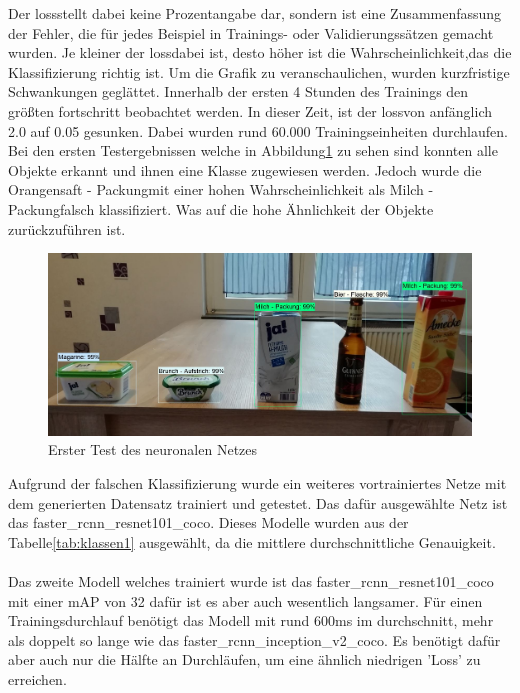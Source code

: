 \documentclass[a4paper,12pt,oneside]{article}
\begin{document}
Der \glqq loss\grqq stellt dabei keine Prozentangabe dar, sondern ist eine Zusammenfassung der Fehler, die für jedes Beispiel in Trainings- oder Validierungssätzen gemacht wurden. Je kleiner der \glqq loss\grqq dabei ist, desto höher ist die Wahrscheinlichkeit,das die Klassifizierung richtig ist. Um die Grafik zu veranschaulichen, wurden kurzfristige Schwankungen geglättet. Innerhalb der ersten 4 Stunden des Trainings den größten fortschritt beobachtet werden. In dieser Zeit, ist der \glqq loss\grqq von anfänglich 2.0 auf 0.05 gesunken. Dabei wurden rund 60.000 Trainingseinheiten durchlaufen.\\
Bei den ersten Testergebnissen welche in Abbildung\ref{img:TestNN} zu sehen sind konnten alle Objekte erkannt und ihnen eine Klasse zugewiesen werden. Jedoch wurde die \glqq Orangensaft - Packung\grqq mit einer hohen Wahrscheinlichkeit als \glqq Milch - Packung\grqq falsch klassifiziert. Was auf die hohe Ähnlichkeit der Objekte zurückzuführen ist.
\\

\begin{figure}
    [h]
	\centering
	\includegraphics[scale=0.3]{Sources/Erster_Test.jpg}
	\caption{Erster Test des neuronalen Netzes}
	\label{img:TestNN}
\end{figure}

Aufgrund der falschen Klassifizierung wurde ein weiteres vortrainiertes Netze mit dem generierten Datensatz trainiert und getestet. Das dafür ausgewählte Netz ist das faster\_rcnn\_resnet101\_coco. Dieses Modelle wurden aus der Tabelle\ref{tab:klassen1} ausgewählt, da die mittlere durchschnittliche Genauigkeit.
\\
\\
Das zweite Modell welches trainiert wurde ist das faster\_rcnn\_resnet101\_coco mit einer mAP von 32 dafür ist es aber auch wesentlich langsamer. Für einen Trainingsdurchlauf benötigt das Modell mit rund 600ms im durchschnitt, mehr als doppelt so lange wie das faster\_rcnn\_inception\_v2\_coco. Es benötigt dafür aber auch nur die Hälfte an Durchläufen, um eine ähnlich niedrigen 'Loss' zu erreichen.\\ 
\end{document}
